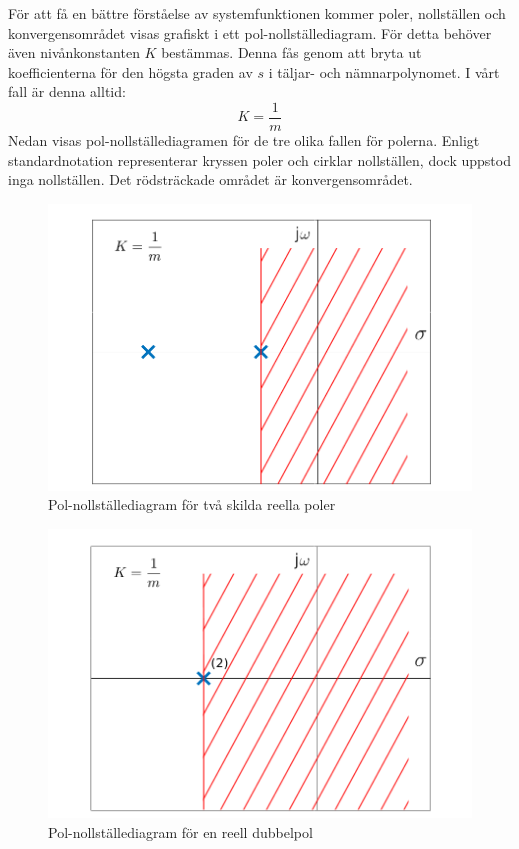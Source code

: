 För att få en bättre förståelse av systemfunktionen kommer poler, nollställen och konvergensområdet visas grafiskt i ett pol-nollställediagram. För detta behöver även nivånkonstanten $K$ bestämmas. Denna fås genom att bryta ut koefficienterna för den högsta graden av $s$ i täljar- och nämnarpolynomet. I vårt fall är denna alltid:
$$K=\frac{1}{m}$$
Nedan visas pol-nollställediagramen för de tre olika fallen för polerna. Enligt standardnotation representerar kryssen poler och cirklar nollställen, dock uppstod inga nollställen. Det rödsträckade området är konvergensområdet.

\begin{figure}[H] 
    \centering
    \includegraphics[scale=0.33]{bilder/pol_nollstallediagram_2_poler}
    \caption{Pol-nollställediagram för två skilda reella poler}
    \label{fig:pol_nollstallediagram_2_poler}
\end{figure}
\begin{figure}[H] 
    \centering
    \includegraphics[scale=0.33]{bilder/pol_nollstallediagram_dubbelpol}
    \caption{Pol-nollställediagram för en reell dubbelpol}
    \label{fig:pol_nollstallediagram_dubbelpol}
\end{figure}

